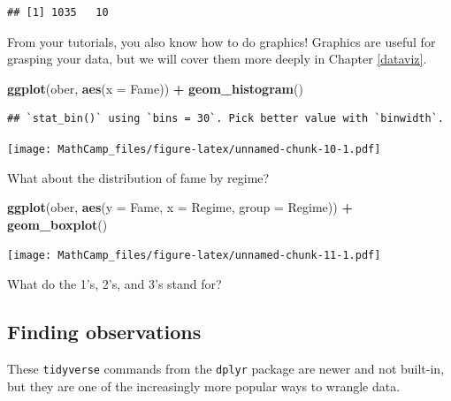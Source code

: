 \documentclass[
]{book}
\newenvironment{Shaded}{\begin{snugshade}}{\end{snugshade}}
\newcommand{\DataTypeTok}[1]{\textcolor[rgb]{0.13,0.29,0.53}{#1}}
\newcommand{\KeywordTok}[1]{\textcolor[rgb]{0.13,0.29,0.53}{\textbf{#1}}}
\newcommand{\NormalTok}[1]{#1}
\newcommand{\OperatorTok}[1]{\textcolor[rgb]{0.81,0.36,0.00}{\textbf{#1}}}
\newcommand{\StringTok}[1]{\textcolor[rgb]{0.31,0.60,0.02}{#1}}
\theoremstyle{definition}
\theoremstyle{definition}
\theoremstyle{definition}
\theoremstyle{definition}
\theoremstyle{remark}
\begin{document}
\begin{verbatim}
## [1] 1035   10
\end{verbatim}

From your tutorials, you also know how to do graphics! Graphics are useful for grasping your data, but we will cover them more deeply in Chapter \ref{dataviz}.

\begin{Shaded}
\begin{Highlighting}[]
\KeywordTok{ggplot}\NormalTok{(ober, }\KeywordTok{aes}\NormalTok{(}\DataTypeTok{x =}\NormalTok{ Fame)) }\OperatorTok{+}\StringTok{ }\KeywordTok{geom_histogram}\NormalTok{()}
\end{Highlighting}
\end{Shaded}

\begin{verbatim}
## `stat_bin()` using `bins = 30`. Pick better value with `binwidth`.
\end{verbatim}

\texttt{[image: MathCamp\_files/figure-latex/unnamed-chunk-10-1.pdf]}

What about the distribution of fame by regime?

\begin{Shaded}
\begin{Highlighting}[]
\KeywordTok{ggplot}\NormalTok{(ober, }\KeywordTok{aes}\NormalTok{(}\DataTypeTok{y =}\NormalTok{ Fame, }\DataTypeTok{x =}\NormalTok{ Regime, }\DataTypeTok{group =}\NormalTok{ Regime)) }\OperatorTok{+}
\StringTok{  }\KeywordTok{geom_boxplot}\NormalTok{()}
\end{Highlighting}
\end{Shaded}

\texttt{[image: MathCamp\_files/figure-latex/unnamed-chunk-11-1.pdf]}

What do the 1's, 2's, and 3's stand for?

\hypertarget{finding-observations}{%
\subsection{Finding observations}\label{finding-observations}}

These \texttt{tidyverse} commands from the \texttt{dplyr} package are newer and not built-in, but they are one of the increasingly more popular ways to wrangle data.
\end{document}
